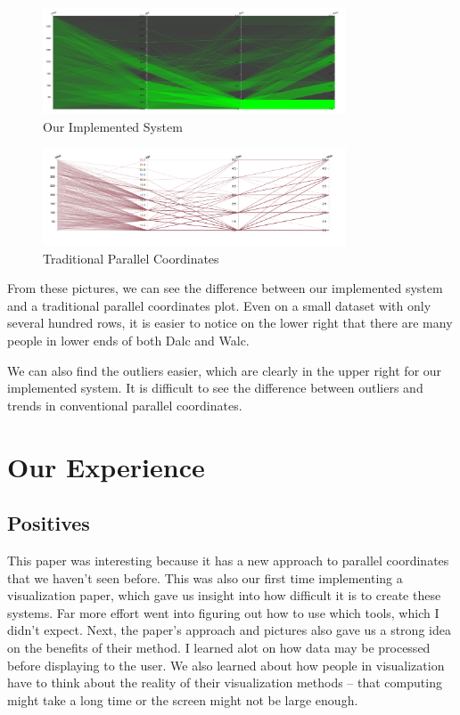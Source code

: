 \documentclass[	DIV=calc,%
			paper=a4,%
			fontsize=11pt,%
			twocolumn]{scrartcl}					%
\begin{document}
\begin{figure}
  \caption{Our Implemented System}
  \centering
    \includegraphics[width=9cm]{alc-opf.png}
\end{figure}

\begin{figure}
  \caption{Traditional Parallel Coordinates}
  \centering
    \includegraphics[width=9cm]{age-alc-orig.png}
\end{figure}

From these pictures, we can see the difference between our implemented system and a traditional
parallel coordinates plot. Even on a small dataset with only several hundred rows, 
it is easier to notice on the lower right that there are many people in lower ends of both Dalc and Walc. 

We can also find the outliers easier, which are clearly in the upper right for our implemented system. 
It is difficult to see the difference between outliers and trends in conventional parallel coordinates.

\section {Our Experience}

\subsection {Positives}
This paper was interesting because it has a new approach to parallel coordinates that we haven't seen before. This was also our first time implementing a visualization paper, 
which gave us insight into how difficult it is to create these systems. Far more effort went into figuring out how to use which tools, which I didn't expect. Next, the paper's approach
and pictures also gave us a strong idea on the benefits of their method. I learned alot on how data may be processed before displaying to the user. We also learned about
how people in visualization have to think about the reality of their visualization methods -- that computing might take a long time or the screen might not be large enough. 
\end{document}
